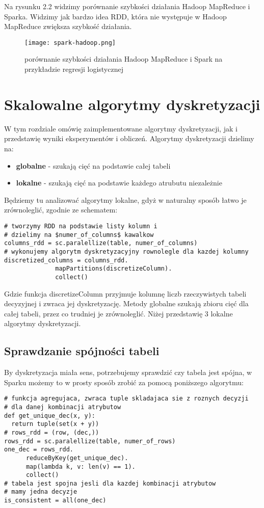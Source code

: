 \documentclass[magisterska]{pracamgr}
\theoremstyle{plain}
\theoremstyle{definition}
\theoremstyle{remark}
\begin{document}
Na rysunku 2.2 widzimy porównanie szybkości działania Hadoop MapReduce i Sparka. Widzimy jak bardzo idea RDD, która 
nie występuje w Hadoop MapReduce zwiększa szybkość działania.
\begin{figure}
 \caption{porównanie szybkości działania Hadoop MapReduce i Spark na przykładzie regresji logistycznej}
 \texttt{[image: spark-hadoop.png]}
\end{figure}


\chapter{Skalowalne algorytmy dyskretyzacji}

W tym rozdziale omówię zaimplementowane algorytmy dyskretyzacji, jak i przedstawię wyniki eksperymentów i obliczeń.
Algorytmy dyskretyzacji dzielimy na:
\begin{itemize}
 \item \textbf{globalne} - szukają cięć na podstawie całej tabeli
 \item \textbf{lokalne} - szukają cięć na podstawie każdego atrubutu niezależnie
\end{itemize}
Będziemy tu analizować algorytmy lokalne, gdyż
w naturalny sposób łatwo je zrównoleglić, zgodnie ze schematem:
\begin{lstlisting}
# tworzymy RDD na podstawie listy kolumn i 
# dzielimy na $numer_of_columns$ kawalkow
columns_rdd = sc.paralellize(table, numer_of_columns)
# wykonujemy algorytm dyskretyzacyjny rownolegle dla kazdej kolumny
discretized_columns = columns_rdd.
		      mapPartitions(discretizeColumn).
		      collect()
\end{lstlisting}
Gdzie funkcja discretizeColumn przyjmuje kolumnę liczb rzeczywistych tabeli decyzyjnej i zwraca
jej dyskretyzację.
Metody globalne szukają zbioru cięć dla całej tabeli, przez co trudniej je zrównoleglić.
Niżej przedstawię 3 lokalne algorytmy dyskretyzacji.

\section{Sprawdzanie spójności tabeli}
By dyskretyzacja miała sens, potrzebujemy sprawdzić czy tabela jest spójna, w Sparku możemy 
to w prosty sposób zrobić za pomocą poniższego algorytmu:
\begin{lstlisting}
# funkcja agregujaca, zwraca tuple skladajaca sie z roznych decyzji
# dla danej kombinacji atrybutow
def get_unique_dec(x, y):
  return tuple(set(x + y))
# rows_rdd = (row, (dec,))
rows_rdd = sc.paralellize(table, numer_of_rows)
one_dec = rows_rdd.
	  reduceByKey(get_unique_dec).
	  map(lambda k, v: len(v) == 1).
	  collect()
# tabela jest spojna jesli dla kazdej kombinacji atrybutow
# mamy jedna decyzje
is_consistent = all(one_dec)
\end{lstlisting}
\end{document}
